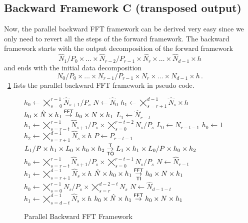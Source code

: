 \subsection{Backward Framework C (transposed output)}
Now, the parallel backward FFT framework can be derived very easy since we only need to revert all the steps
of the forward framework. The backward framework starts with the output decomposition of the forward framework
\begin{equation*}
  \hat N_1/P_0 \times \hdots \times \hat N_{r-2}/P_{r-1} \times \hat N_r \times \hdots \times \hat N_{d-1} \times h
\end{equation*}
and ends with the initial data decomposition
\begin{equation*}
  N_0/P_0 \times \hdots \times N_{r-1}/P_{r-1} \times N_r \times \hdots \times N_{d-1} \times h\,.
\end{equation*}
\figurename{}~\ref{fig:fft_back} lists the parallel backward FFT framework in pseudo code.
\begin{figure}[ht]
  \begin{algorithmic}[1]
    \State $h_0 \gets \bigtimes_{s=0}^{r-1}\hat N_{s+1}/P_s$
    \State $N   \gets \hat N_0$
    \State $h_1 \gets \bigtimes_{s=r+1}^{d-1} \hat N_s \times h$
    \State $h_0 \times \hat N \times h_1 \overset{\textsf{FFT}}{\rightarrow} h_0 \times N \times h_1$
      \State $L_1 \gets \hat N_{r-t}$
      \State $h_1 \gets \bigtimes_{s=r-t}^{r-1}\hat N_{s+1}/P_{s} \times \bigtimes_{s=0}^{r-t-2} N_s/P_s$
      \State $L_0 \gets N_{r-t-1}$
      \State $h_0 \gets 1$
      \State $h_2 \gets \bigtimes_{s=r+1}^{d-1} \hat N_s \times h$
      \State $P   \gets P_{r-t-1}$
      \State $L_1/P \times h_1 \times L_0 \times h_0 \times h_2\overset{\textsf{T}}{\underset{\textsf{TO}}{\rightarrow}} L_1 \times h_1 \times L_0/P \times h_0 \times h_2$
      \State
      \State $h_0 \gets \bigtimes_{s=r-t}^{r-1} \hat N_{s+1}/P_s \times \bigtimes_{s=0}^{r-t-1} N_s/P_s$
      \State $N   \gets \hat N_{r-t}$
      \State $h_1 \gets \bigtimes_{s=r+1}^{d-1} \hat N_s \times h$
      \State $\hat N \times h_0 \times h_1 \overset{\textsf{FFT}}{\underset{\textsf{TI}}{\rightarrow}} h_0 \times N \times h_1 $
    \EndFor
      \State $h_0 \gets \bigtimes_{s=0}^{r-1} N_s/P_s \times \bigtimes_{s=r}^{d-2-t} N_s$
      \State $N   \gets \hat N_{d-1-t}$
      \State $h_1 \gets \bigtimes_{s=d-t}^{d-1} \hat N_s \times h$
      \State $h_0 \times \hat N \times h_1 \overset{\textsf{FFT}}{\rightarrow} h_0 \times N \times h_1$
    \EndFor
  \end{algorithmic}
  \caption{Parallel Backward FFT Framework}\label{fig:fft_back}
\end{figure}

